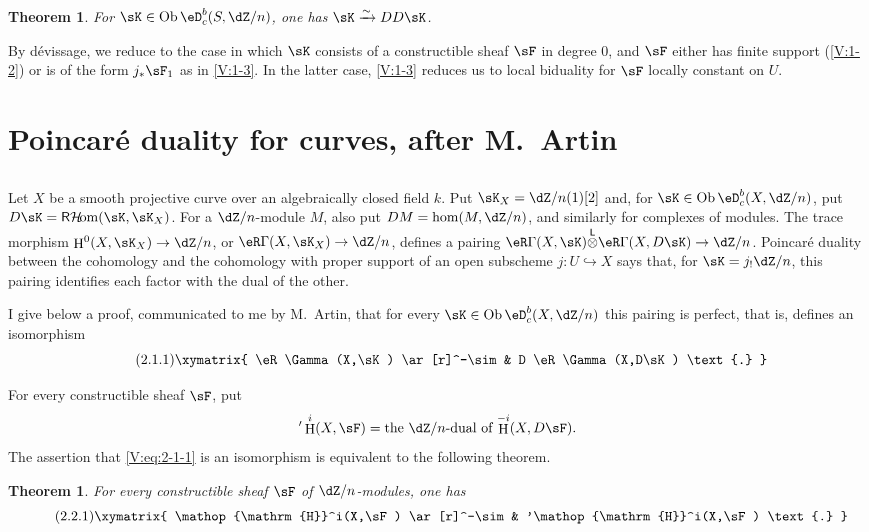\documentclass[12pt,oneside,english]{smfbook}
\DeclareMathOperator{\h}{H}
\DeclareMathOperator{\ob}{Ob}
\DeclareMathOperator{\rHom}{\mathsf{R}\mathcal{H}\!om}
\newcommand{\iso}{\xrightarrow\sim}
\newcommand{\lotimes}{{\overset{\mathsf{L}}{\otimes}}}
\newtheorem{theorem_}[subsection]{Theorem}
\begin{document}
\begin{theorem_}\label{V:1-4}
For $\sK\in\ob\eD_c^b(S,\dZ/n)$, one has $\sK\iso DD\sK$.
\end{theorem_}

By dévissage, we reduce to the case in which $\sK$ consists of a constructible sheaf $\sF$ in degree $0$, and $\sF$ either has finite support (\ref{V:1-2}) or is of the form $j_*\sF_1$ as in \ref{V:1-3}. In the latter case, \ref{V:1-3} reduces us to local biduality for $\sF$ locally constant on $U$.

\section{Poincaré duality for curves, after M.\ Artin}\label{V:2}

\subsection{}\label{V:2-1}

Let $X$ be a smooth projective curve over an algebraically closed field $k$. Put $\sK_X=\dZ/n(1)[2]$ and, for $\sK\in\ob\eD_c^b(X,\dZ/n)$, put $D\sK=\rHom(\sK,\sK_X)$. For a $\dZ/n$-module $M$, also put $DM=\hom(M,\dZ/n)$, and similarly for complexes of modules. The trace morphism $\h^0(X,\sK_X)\to\dZ/n$, or $\eR\Gamma(X,\sK_X)\to\dZ/n$, defines a pairing $\eR\Gamma(X,\sK)\lotimes\eR\Gamma(X,D\sK)\to\dZ/n$. Poincaré duality between the cohomology and the cohomology with proper support of an open subscheme $j:U\hookrightarrow X$ says that, for $\sK=j_!\dZ/n$, this pairing identifies each factor with the dual of the other.

I give below a proof, communicated to me by M.\ Artin, that for every $\sK\in\ob\eD_c^b(X,\dZ/n)$ this pairing is perfect, that is, defines an isomorphism
\begin{equation*}\tag{2.1.1}\label{V:eq:2-1-1}
\xymatrix{
  \eR\Gamma(X,\sK) \ar[r]^-\sim
    & D \eR\Gamma(X,D\sK) \text{.}
}
\end{equation*}

For every constructible sheaf $\sF$, put
\[
  '\h^i(X,\sF) = \text{the $\dZ/n$-dual of $\h^{-i}(X,D\sF)$.}
\]
The assertion that \eqref{V:eq:2-1-1} is an isomorphism is equivalent to the following theorem.

\begin{theorem_}\label{V:2-2}
For every constructible sheaf $\sF$ of $\dZ/n$-modules, one has
\begin{equation*}\tag{2.2.1}\label{V:eq:2-2-1}
\xymatrix{
  \h^i(X,\sF) \ar[r]^-\sim
    & '\h^i(X,\sF) \text{.}
}
\end{equation*}
\end{theorem_}
\end{document}
